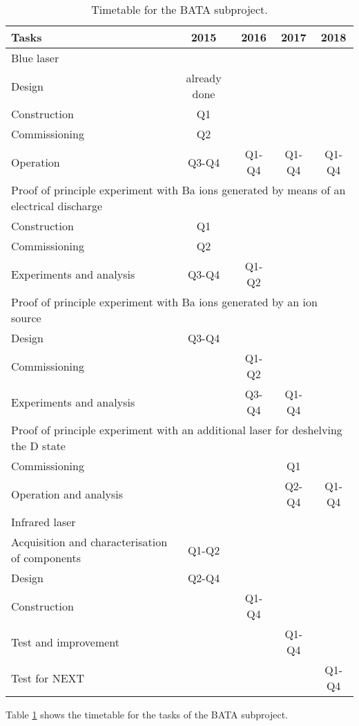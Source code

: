 \begin{table}
\begin{center}
\begin{tabular}{| l | c | c | c | c |}
\hline
Tasks & 2015 & 2016 & 2017 & 2018 \\
\hline
\multicolumn{5}{|l|}{Blue laser}  \\
\hline
Design & already done & & &  \\
Construction & Q1 & & & \\
Commissioning & Q2& & & \\
Operation &  Q3-Q4 & Q1-Q4 &  Q1-Q4&  Q1-Q4\\
\hline
\multicolumn{5}{|l|}{Proof of principle experiment with Ba ions generated by means of an electrical discharge}  \\
\hline
Construction  &  Q1 & & & \\
Commissioning &  Q2 & & & \\
Experiments and analysis &  Q3-Q4 & Q1-Q2& & \\
\hline
\multicolumn{5}{|l|}{Proof of principle experiment with Ba ions generated by an ion source}  \\
\hline
Design & Q3-Q4 & & &  \\
Commissioning  &  & Q1-Q2& & \\
Experiments and analysis &  & Q3-Q4 & Q1-Q4 & \\
\hline
\multicolumn{5}{|l|}{Proof of principle experiment with an additional laser for deshelving the D state}  \\
\hline
Commissioning  &  &  & Q1 & \\
Operation and analysis &  &  & Q2-Q4 & Q1-Q4 \\
\hline
\multicolumn{5}{|l|}{Infrared laser}  \\
\hline
Acquisition and characterisation of components  & Q1-Q2 & & &  \\
Design  & Q2-Q4  & & & \\
Construction &  & Q1-Q4 & & \\
Test and improvement &  & & Q1-Q4 & \\
Test for NEXT & & &  & Q1-Q4\\
\hline
\end{tabular}
\caption{Timetable for the BATA subproject.}
\label{tab:schedule_bata}
\end{center}
\end{table}

Table \ref{tab:schedule_bata} shows the timetable for the tasks of the BATA subproject. 
